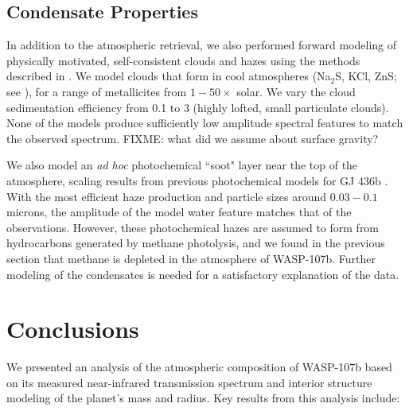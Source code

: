 \documentclass[twocolumn]{aastex61}
\begin{document}
\subsection{Condensate Properties}
In addition to the atmospheric retrieval, we also performed forward modeling of physically motivated, self-consistent clouds and hazes using the methods described in \cite{fortney08, morley15}.  We model clouds that form in cool atmospheres (Na$_2$S, KCl, ZnS; see \citealt{morley12}), for a range of metallicites from $1-50\times$ solar. We vary the cloud sedimentation efficiency from 0.1 to 3 (highly lofted, small particulate clouds). None of the models produce sufficiently low amplitude spectral features to match the observed spectrum. FIXME: what did we assume about surface gravity?

We also model an \emph{ad hoc} photochemical ``soot" layer near the top of the atmosphere, scaling results from previous photochemical models for GJ 436b \citep{line11, morley17}. With the most efficient haze production and particle sizes around $0.03-0.1$ microns, the amplitude of the model water feature matches that of the observations. However, these photochemical hazes are assumed to form from hydrocarbons generated by methane photolysis, and we found in the previous section that methane is depleted in the atmosphere of WASP-107b.  %
Further modeling of the condensates is needed for a satisfactory explanation of the data.

\section{Conclusions} \label{sec:discuss}
We presented an analysis of the atmospheric composition of WASP-107b based on its measured near-infrared transmission spectrum and interior structure modeling of the planet's mass and radius.  Key results from this analysis include:
\end{document}
